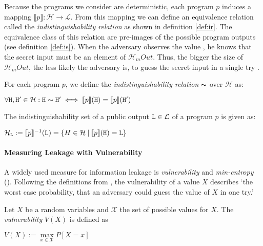 Because the programs we consider are deterministic, each program $p$ induces a mapping $\llbracket p \rrbracket: \mathcal{H} \longrightarrow \mathcal{L}$. From this mapping we can define an equivalence relation called the \emph{indistinguishability relation} as shown in definition \ref{def:ir}. The equivalence class of this relation are pre-images of the possible program outputs (see definition \ref{def:is}). When the adversary observes the value \Out, he knows that the secret input must be an element of $\mathcal{H}_mOut$. Thus, the bigger the size of $\mathcal{H}_mOut$, the less likely the adversary is, to guess the secret input in a single try \cite{backes09, smith09, alvim19}. 

\begin{definition}\label{def:ir}
        For each program $p$, we define the \emph{indistinguishability relation} $\thicksim$ over $\mathcal{H}$ as:
        \begin{center}
            $\forall \mathtt{H}, \mathtt{H}' \in \mathcal{H}: \mathtt{H} \thicksim  \mathtt{H}' \iff \llbracket p \rrbracket(\mathtt{H}) = \llbracket p \rrbracket(\mathtt{H}')$
        \end{center}
\end{definition}

\begin{definition}\label{def:is}
    The indistinguishability set of a public output $\mathtt{L} \in \mathcal{L}$ of a program $p$ is given as:
    \begin{center}
        $\mathcal{H}_{\mathtt{L}} := \llbracket p \rrbracket^{-1} (\mathtt{L}) = \{ H \in \mathcal{H} \: | \: \llbracket p \rrbracket (\mathtt{H}) = \mathtt{L} \}$
    \end{center}
\end{definition}

\paragraph*{Measuring Leakage with Vulnerability}
A widely used measure for information leakage is \emph{vulnerability} and \emph{min-entropy} (). Following the definitions from \cite{smith09}, the vulnerability of a value $X$ describes `the worst case probability, that an adversary could guess the value of $X$ in one try.'

\begin{definition}[Vulnerability]\label{def:vul}
    Let $X$ be a random variables and $\mathcal{X}$ the set of possible values for $X$. The \emph{vulnerability} $V(X)$ is defined as
    \begin{center}
        $V(X) := \max\limits_{x \in \mathcal{X}} P[X = x]$
    \end{center}
\end{definition}

